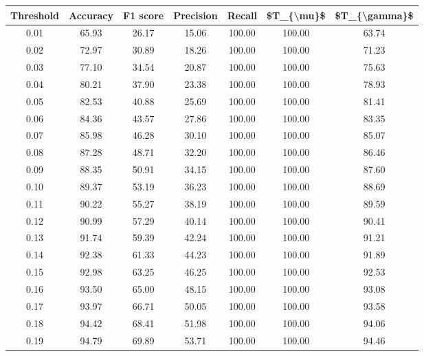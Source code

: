 \begin{tabular}{|c|c|c|c|c|c|c|}
\hline
 Threshold &  Accuracy &  F1 score &  Precision &  Recall &  \$T\_\{\textbackslash mu\}\$ &  \$T\_\{\textbackslash gamma\}\$ \\
\hline
      0.01 &     65.93 &     26.17 &      15.06 &  100.00 &     100.00 &         63.74 \\
      0.02 &     72.97 &     30.89 &      18.26 &  100.00 &     100.00 &         71.23 \\
      0.03 &     77.10 &     34.54 &      20.87 &  100.00 &     100.00 &         75.63 \\
      0.04 &     80.21 &     37.90 &      23.38 &  100.00 &     100.00 &         78.93 \\
      0.05 &     82.53 &     40.88 &      25.69 &  100.00 &     100.00 &         81.41 \\
      0.06 &     84.36 &     43.57 &      27.86 &  100.00 &     100.00 &         83.35 \\
      0.07 &     85.98 &     46.28 &      30.10 &  100.00 &     100.00 &         85.07 \\
      0.08 &     87.28 &     48.71 &      32.20 &  100.00 &     100.00 &         86.46 \\
      0.09 &     88.35 &     50.91 &      34.15 &  100.00 &     100.00 &         87.60 \\
      0.10 &     89.37 &     53.19 &      36.23 &  100.00 &     100.00 &         88.69 \\
      0.11 &     90.22 &     55.27 &      38.19 &  100.00 &     100.00 &         89.59 \\
      0.12 &     90.99 &     57.29 &      40.14 &  100.00 &     100.00 &         90.41 \\
      0.13 &     91.74 &     59.39 &      42.24 &  100.00 &     100.00 &         91.21 \\
      0.14 &     92.38 &     61.33 &      44.23 &  100.00 &     100.00 &         91.89 \\
      0.15 &     92.98 &     63.25 &      46.25 &  100.00 &     100.00 &         92.53 \\
      0.16 &     93.50 &     65.00 &      48.15 &  100.00 &     100.00 &         93.08 \\
      0.17 &     93.97 &     66.71 &      50.05 &  100.00 &     100.00 &         93.58 \\
      0.18 &     94.42 &     68.41 &      51.98 &  100.00 &     100.00 &         94.06 \\
      0.19 &     94.79 &     69.89 &      53.71 &  100.00 &     100.00 &         94.46 \\

\end{tabular}
